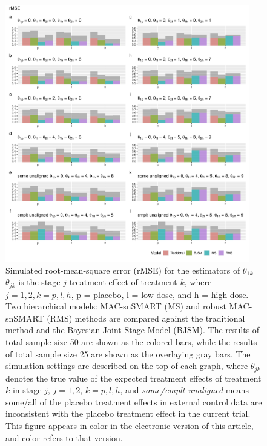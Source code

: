 \begin{figure}
\includegraphics[width=0.95\textwidth]{chapters/figures/Figure3.pdf}
\caption{Simulated root-mean-square error (rMSE) for the estimators of $\theta_{1k}$ \\ $\theta_{jk}$ is the stage $j$ treatment effect of treatment $k$, where $j = 1,2, k = p, l, h$, p = placebo, l = low dose, and h = high dose. Two hierarchical models: MAC-snSMART (MS) and robust MAC-snSMART (RMS) methods are compared against the traditional method and the Bayesian Joint Stage Model (BJSM). The results of total sample size 50 are shown as the colored bars, while the results of total sample size 25 are shown as the overlaying gray bars. The simulation settings are described on the top of each graph, where $\theta_{jk}$ denotes the true value of the expected treatment effects of treatment $k$ in stage $j$, $j = 1, 2$, $k = p, l, h$, and \emph{some/cmplt unaligned} means some/all of the placebo treatment effects in external control data are inconsistent with the placebo treatment effect in the current trial. This figure appears in color in the electronic version of this article, and color refers to that version.}
\label{fig:rMSE}
\end{figure}


